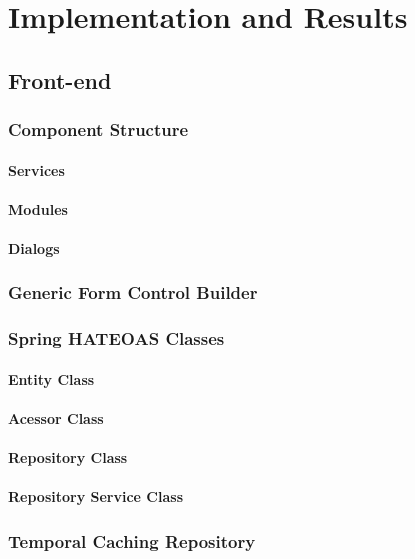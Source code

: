\chapter{Implementation and Results}\label{cha:implementation}

\section{Front-end}\label{cha:implementation:sec:front-end}

\subsection{Component Structure}

\subsubsection{Services}
\subsubsection{Modules}
\subsubsection{Dialogs}
\subsection{Generic Form Control Builder}
\subsection{Spring HATEOAS Classes}
\subsubsection{Entity Class}
\subsubsection{Acessor Class}
\subsubsection{Repository Class}
\subsubsection{Repository Service Class}
\subsection{Temporal Caching Repository}
